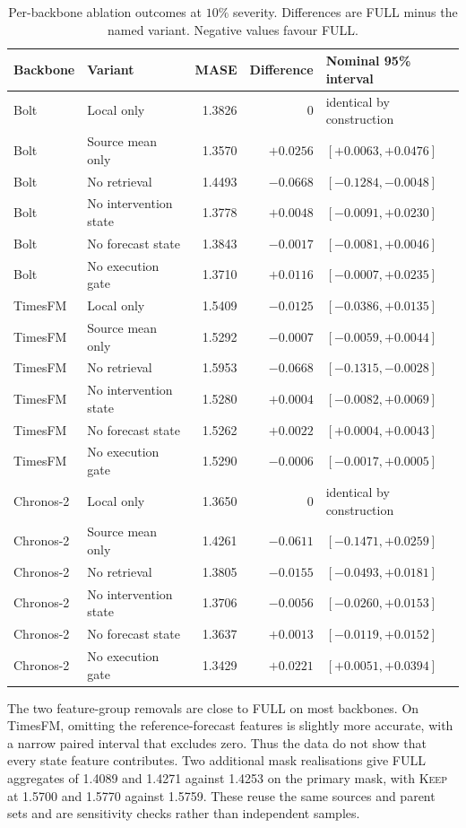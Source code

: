 \documentclass{article}
\begin{document}
\begin{table}[htbp]
\centering\small
\caption{Per-backbone ablation outcomes at $10\%$ severity. Differences are FULL minus the
named variant. Negative values favour FULL.}
\label{tab:v52-a2}
\begin{tabular}{llrrl}
\toprule
Backbone & Variant & MASE & Difference & Nominal 95\% interval \\
\midrule
Bolt & Local only & 1.3826 & $0$ & identical by construction \\
Bolt & Source mean only & 1.3570 & $+0.0256$ & $[+0.0063,+0.0476]$ \\
Bolt & No retrieval & 1.4493 & $-0.0668$ & $[-0.1284,-0.0048]$ \\
Bolt & No intervention state & 1.3778 & $+0.0048$ & $[-0.0091,+0.0230]$ \\
Bolt & No forecast state & 1.3843 & $-0.0017$ & $[-0.0081,+0.0046]$ \\
Bolt & No execution gate & 1.3710 & $+0.0116$ & $[-0.0007,+0.0235]$ \\
TimesFM & Local only & 1.5409 & $-0.0125$ & $[-0.0386,+0.0135]$ \\
TimesFM & Source mean only & 1.5292 & $-0.0007$ & $[-0.0059,+0.0044]$ \\
TimesFM & No retrieval & 1.5953 & $-0.0668$ & $[-0.1315,-0.0028]$ \\
TimesFM & No intervention state & 1.5280 & $+0.0004$ & $[-0.0082,+0.0069]$ \\
TimesFM & No forecast state & 1.5262 & $+0.0022$ & $[+0.0004,+0.0043]$ \\
TimesFM & No execution gate & 1.5290 & $-0.0006$ & $[-0.0017,+0.0005]$ \\
Chronos-2 & Local only & 1.3650 & $0$ & identical by construction \\
Chronos-2 & Source mean only & 1.4261 & $-0.0611$ & $[-0.1471,+0.0259]$ \\
Chronos-2 & No retrieval & 1.3805 & $-0.0155$ & $[-0.0493,+0.0181]$ \\
Chronos-2 & No intervention state & 1.3706 & $-0.0056$ & $[-0.0260,+0.0153]$ \\
Chronos-2 & No forecast state & 1.3637 & $+0.0013$ & $[-0.0119,+0.0152]$ \\
Chronos-2 & No execution gate & 1.3429 & $+0.0221$ & $[+0.0051,+0.0394]$ \\
\bottomrule
\end{tabular}
\end{table}

The two feature-group removals are close to FULL on most backbones. On TimesFM, omitting the
reference-forecast features is slightly more accurate, with a narrow paired interval that
excludes zero. Thus the data do not show that every state feature contributes. Two additional
mask realisations give FULL aggregates of 1.4089 and 1.4271 against 1.4253 on the primary
mask, with \textsc{Keep} at 1.5700 and 1.5770 against 1.5759. These reuse the same sources
and parent sets and are sensitivity checks rather than independent samples.
\end{document}
